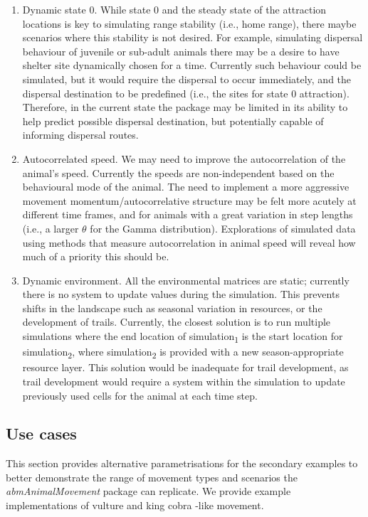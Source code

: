 \documentclass[10pt,a4paper]{article}
\begin{document}
\begin{enumerate}
\def\labelenumi{\arabic{enumi}.}
\item
  Dynamic state 0. While state 0 and the steady state of the attraction locations is key to simulating range stability (i.e., home range), there maybe scenarios where this stability is not desired.
  For example, simulating dispersal behaviour of juvenile or sub-adult animals there may be a desire to have shelter site dynamically chosen for a time.
  Currently such behaviour could be simulated, but it would require the dispersal to occur immediately, and the dispersal destination to be predefined (i.e., the sites for state 0 attraction).
  Therefore, in the current state the package may be limited in its ability to help predict possible dispersal destination, but potentially capable of informing dispersal routes.
\item
  Autocorrelated speed. We may need to improve the autocorrelation of the animal's speed.
  Currently the speeds are non-independent based on the behavioural mode of the animal.
  The need to implement a more aggressive movement momentum/autocorrelative structure may be felt more acutely at different time frames, and for animals with a great variation in step lengths (i.e., a larger \(\theta\) for the Gamma distribution).
  Explorations of simulated data using methods that measure autocorrelation in animal speed will reveal how much of a priority this should be.
\item
  Dynamic environment. All the environmental matrices are static; currently there is no system to update values during the simulation.
  This prevents shifts in the landscape such as seasonal variation in resources, or the development of trails.
  Currently, the closest solution is to run multiple simulations where the end location of simulation\textsubscript{1} is the start location for simulation\textsubscript{2}, where simulation\textsubscript{2} is provided with a new season-appropriate resource layer.
  This solution would be inadequate for trail development, as trail development would require a system within the simulation to update previously used cells for the animal at each time step.
\end{enumerate}

\hypertarget{use-cases}{%
\subsection{Use cases}\label{use-cases}}

This section provides alternative parametrisations for the secondary examples to better demonstrate the range of movement types and scenarios the \emph{abmAnimalMovement} package can replicate.
We provide example implementations of vulture and king cobra -like movement.
\end{document}
